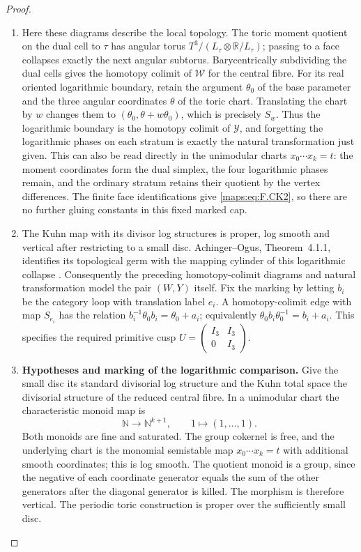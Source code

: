 \begin{proof}
\begin{enumerate}[label={$\langle1\rangle$\arabic*.}]
\item Here these diagrams describe the local topology.
The toric moment quotient on the dual cell to $\tau$ has
angular torus $T^3/(L_\tau\otimes\mathbb R/L_\tau)$;
passing to a face collapses exactly the next angular
subtorus.  Barycentrically subdividing the dual cells gives
the homotopy colimit of $\mathcal W$ for the central fibre.
For its real oriented logarithmic boundary, retain the
argument $\theta_0$ of the base parameter and the three
angular coordinates $\theta$ of the toric chart.  Translating
the chart by $w$ changes them to
$(\theta_0,\theta+w\theta_0)$, which is precisely $S_w$.
Thus the logarithmic boundary is the homotopy colimit of
$\mathcal Y$, and forgetting the logarithmic phases on each
stratum is exactly the natural transformation just given.
This can also be read directly in the unimodular charts
$x_0\cdots x_k=t$: the moment coordinates form the dual
simplex, the four logarithmic phases remain, and the ordinary
stratum retains their quotient by the vertex differences.
The finite face identifications give \eqref{maps:eq:F.CK2}, so there are
no further gluing constants in this fixed marked cap.

\item The Kuhn map with its divisor log structures is proper,
log smooth and vertical after restricting to a small disc.
Achinger--Ogus, Theorem~4.1.1, identifies its topological germ
with the mapping cylinder of this logarithmic collapse
\cite[Theorem 4.1.1 and Lemmas 4.1.2--4.1.3, pp.~480--482]{ffAchingerOgus20}.  Consequently the preceding
homotopy-colimit diagrams and natural transformation model
the pair $(W,Y)$ itself.  Fix the marking by letting $b_i$
be the category loop with translation label $e_i$.  A
homotopy-colimit edge with map $S_{e_i}$ has the relation
$b_i^{-1}\theta_0b_i=\theta_0+a_i$; equivalently
$\theta_0b_i\theta_0^{-1}=b_i+a_i$.  This specifies the
required primitive cusp
$U=\begin{pmatrix}I_3&I_3\\0&I_3\end{pmatrix}$.

\item \par\medskip\noindent\textbf{Hypotheses and marking of the logarithmic comparison.}\quad 
\hypertarget{tag-02J2}{}\label{maps:mapsF:repair:log-cylinder-scope}
Give the small disc its standard divisorial log structure and
the Kuhn total space the divisorial structure of the reduced
central fibre.  In a unimodular chart the characteristic
monoid map is
\[
 \mathbb N\longrightarrow\mathbb N^{k+1},\qquad
 1\longmapsto(1,\ldots,1).
\]
Both monoids are fine and saturated.  The group cokernel is
free, and the underlying chart is the monomial semistable
map $x_0\cdots x_k=t$ with additional smooth coordinates;
this is log smooth.  The quotient monoid is a group, since
the negative of each coordinate generator equals the sum of
the other generators after the diagonal generator is killed.
The morphism is therefore vertical.  The periodic toric
construction is proper over the sufficiently small disc.


\end{enumerate}
\end{proof}
